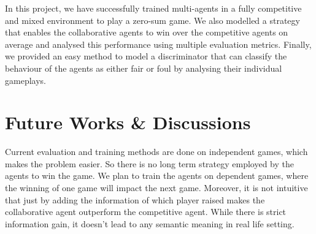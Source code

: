 \documentclass{article}
\begin{document}
In this project, we have successfully trained multi-agents in a fully competitive and mixed environment to play a zero-sum game. We also modelled a strategy that enables the collaborative agents to win over the competitive agents on average and analysed this performance using multiple evaluation metrics. Finally, we provided an easy method to model a discriminator that can classify the behaviour of the agents as either fair or foul by analysing their individual gameplays. 

\section{Future Works \& Discussions} %
Current evaluation and training methods are done on independent games, which makes the problem easier. So there is no long term strategy employed by the agents to win the game. We plan to train the agents on dependent games, where the winning of one game will impact the next game. Moreover, it is not intuitive that just by adding the information of which player raised makes the collaborative agent outperform the competitive agent. While there is strict information gain, it doesn't lead to any semantic meaning in real life setting.

\newpage



\end{document}
